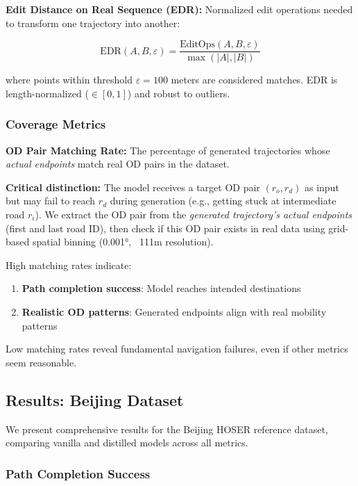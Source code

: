 \textbf{Edit Distance on Real Sequence (EDR):} Normalized edit operations needed to transform one trajectory into another:

\begin{equation}
\text{EDR}(A, B, \varepsilon) = \frac{\text{EditOps}(A, B, \varepsilon)}{\max(|A|, |B|)}
\end{equation}

where points within threshold $\varepsilon = 100$ meters are considered matches. EDR is length-normalized ($\in [0,1]$) and robust to outliers.

\subsubsection{Coverage Metrics}

\textbf{OD Pair Matching Rate:} The percentage of generated trajectories whose \emph{actual endpoints} match real OD pairs in the dataset.

\textbf{Critical distinction:} The model receives a target OD pair $(r_o, r_d)$ as input but may fail to reach $r_d$ during generation (e.g., getting stuck at intermediate road $r_i$). We extract the OD pair from the \emph{generated trajectory's actual endpoints} (first and last road ID), then check if this OD pair exists in real data using grid-based spatial binning (0.001°, ~111m resolution).

High matching rates indicate:
\begin{enumerate}[noitemsep,topsep=0pt]
\item \textbf{Path completion success}: Model reaches intended destinations
\item \textbf{Realistic OD patterns}: Generated endpoints align with real mobility patterns
\end{enumerate}

Low matching rates reveal fundamental navigation failures, even if other metrics seem reasonable.

\subsection{Results: Beijing Dataset}
\label{sec:eval-beijing}

We present comprehensive results for the Beijing HOSER reference dataset, comparing vanilla and distilled models across all metrics.

\subsubsection{Path Completion Success}

